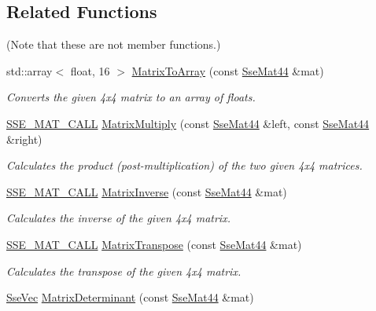 \subsection*{Related Functions}
(Note that these are not member functions.) {\bf }\par
\begin{DoxyCompactItemize}
\item 
std\+::array$<$ float, 16 $>$ \hyperlink{classgfxmath_1_1_sse_mat44_a5f87ab4eb6093d145cda3e6772c6bc0a}{Matrix\+To\+Array} (const \hyperlink{classgfxmath_1_1_sse_mat44}{Sse\+Mat44} \&mat)
\begin{DoxyCompactList}\small\item\em Converts the given 4x4 matrix to an array of floats. \end{DoxyCompactList}\item 
\hyperlink{ssemat__math__defs_8h_a741f88d5589197d03fea9ab2b7622b8a}{S\+S\+E\+\_\+\+M\+A\+T\+\_\+\+C\+A\+L\+L} \hyperlink{classgfxmath_1_1_sse_mat44_ab38872b965a424d2660e1c4be71ddbe6}{Matrix\+Multiply} (const \hyperlink{classgfxmath_1_1_sse_mat44}{Sse\+Mat44} \&left, const \hyperlink{classgfxmath_1_1_sse_mat44}{Sse\+Mat44} \&right)
\begin{DoxyCompactList}\small\item\em Calculates the product (post-\/multiplication) of the two given 4x4 matrices. \end{DoxyCompactList}\item 
\hyperlink{ssemat__math__defs_8h_a741f88d5589197d03fea9ab2b7622b8a}{S\+S\+E\+\_\+\+M\+A\+T\+\_\+\+C\+A\+L\+L} \hyperlink{classgfxmath_1_1_sse_mat44_a7d63a634b20c220ad6047dc4633bf70f}{Matrix\+Inverse} (const \hyperlink{classgfxmath_1_1_sse_mat44}{Sse\+Mat44} \&mat)
\begin{DoxyCompactList}\small\item\em Calculates the inverse of the given 4x4 matrix. \end{DoxyCompactList}\item 
\hyperlink{ssemat__math__defs_8h_a741f88d5589197d03fea9ab2b7622b8a}{S\+S\+E\+\_\+\+M\+A\+T\+\_\+\+C\+A\+L\+L} \hyperlink{classgfxmath_1_1_sse_mat44_a8c2545c52a86496bdf8917a1158f6f24}{Matrix\+Transpose} (const \hyperlink{classgfxmath_1_1_sse_mat44}{Sse\+Mat44} \&mat)
\begin{DoxyCompactList}\small\item\em Calculates the transpose of the given 4x4 matrix. \end{DoxyCompactList}\item 
\hyperlink{namespacegfxmath_a0de2243e2b8d0fd46d3af5e036423004}{Sse\+Vec} \hyperlink{classgfxmath_1_1_sse_mat44_a6709364ddedc83299a1d6a58607a87aa}{Matrix\+Determinant} (const \hyperlink{classgfxmath_1_1_sse_mat44}{Sse\+Mat44} \&mat)

\end{DoxyCompactItemize}
